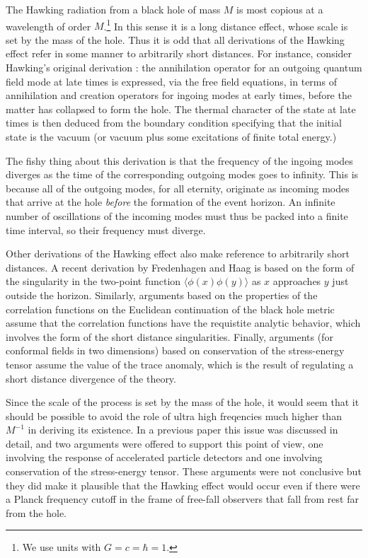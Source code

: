 \documentclass[12pt]{article}
\begin{document}
The Hawking radiation from a black hole of mass $M$ is most
copious at a wavelength of order $M$.\footnote{We use
units with $G=c=\hbar=1$.} In this sense it is a long
distance effect, whose scale is set by the mass of the hole.
Thus it is odd that all derivations of the Hawking
effect refer in some manner to arbitrarily short distances.
For instance, consider Hawking's original derivation
\cite{Hawk75}: the annihilation operator for an outgoing quantum
field mode at late times is expressed, via the free field
equations, in terms of annihilation and creation operators
for ingoing modes at early times, before the matter has
collapsed to form the hole. The thermal character of the
state at late times is then deduced from the boundary
condition specifying that the initial state is the vacuum
(or vacuum plus some excitations of finite total energy.)

The fishy thing about this derivation is that the frequency
of the ingoing modes diverges as the time of the corresponding
outgoing modes goes to infinity. This is because all of the
outgoing modes, for all eternity, originate as incoming
modes that arrive at the hole {\it before} the formation of
the event horizon. An infinite number of oscillations of the
incoming modes must thus be packed into a finite time
interval, so their frequency must diverge.

Other derivations of the Hawking effect also make reference
to arbitrarily short distances. A recent derivation by
Fredenhagen and Haag \cite{FredHaag} is based on the form of the
singularity in the two-point function
$\langle\phi(x)\phi(y)\rangle$ as $x$ approaches $y$
just outside the horizon.
Similarly, arguments based on the properties of the
correlation functions on the Euclidean continuation of the
black hole metric \cite{GibbPerry} assume that the correlation
functions have the requistite analytic behavior, which
involves the form of the short distance singularities.
Finally, arguments (for conformal fields  in two dimensions)
based on conservation of the stress-energy tensor
\cite{DavFullUn,ChristFull} assume the value of the trace
anomaly, which is the result of regulating a short distance
divergence of the theory.

Since the scale of the process is set by the mass of the
hole, it would seem that it should be possible to avoid the
role of ultra high freqencies much higher than $M^{-1}$
in deriving its existence. In a previous paper \cite{Jac} this
issue was discussed in detail, and two arguments were
offered to support this point of view, one involving the
response of accelerated particle detectors and one involving
conservation of the stress-energy tensor. These arguments
were not conclusive but they did make it plausible that the
Hawking effect would occur even if there were a Planck
frequency cutoff in the frame of free-fall observers that
fall from rest far from the hole.
\end{document}
